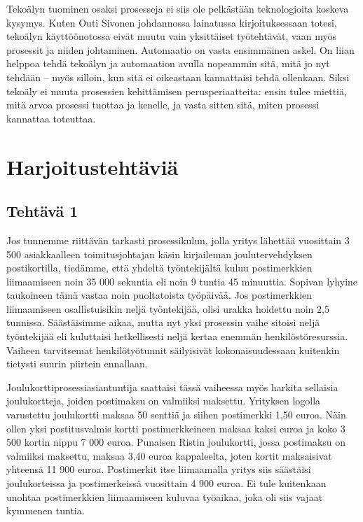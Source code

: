 \documentclass[
  finnish,
  letterpaper,
  DIV=11,
  numbers=noendperiod,
  oneside]{scrreprt}
\begin{document}
Tekoälyn tuominen osaksi prosesseja ei siis ole pelkästään teknologioita
koskeva kysymys. Kuten Outi Sivonen johdannossa lainatussa
kirjoituksessaan totesi, tekoälyn käyttöönotossa eivät muutu vain
yksittäiset työtehtävät, vaan myös prosessit ja niiden johtaminen.
Automaatio on vasta ensimmäinen askel. On liian helppoa tehdä tekoälyn
ja automaation avulla nopeammin sitä, mitä jo nyt tehdään -- myös
silloin, kun sitä ei oikeastaan kannattaisi tehdä ollenkaan. Siksi
tekoäly ei muuta prosessien kehittämisen perusperiaatteita: ensin tulee
miettiä, mitä arvoa prosessi tuottaa ja kenelle, ja vasta sitten sitä,
miten prosessi kannattaa toteuttaa.


\chapter{Harjoitustehtäviä}\label{harjoitustehtuxe4viuxe4}

\section{Tehtävä 1}\label{tehtuxe4vuxe4-1}

Jos tunnemme riittävän tarkasti prosessikulun, jolla yritys lähettää
vuosittain 3 500 asiakkaalleen toimitusjohtajan käsin kirjaileman
joulutervehdyksen postikortilla, tiedämme, että yhdeltä työntekijältä
kuluu postimerkkien liimaamiseen noin 35 000 sekuntia eli noin 9 tuntia
45 minuuttia. Sopivan lyhyine taukoineen tämä vastaa noin puoltatoista
työpäivää. Jos postimerkkien liimaamiseen osallistuisikin neljä
työntekijää, olisi urakka hoidettu noin 2,5 tunnissa. Säästäisimme
aikaa, mutta nyt yksi prosessin vaihe sitoisi neljä työntekijää eli
kuluttaisi hetkellisesti neljä kertaa enemmän henkilöstöresurssia.
Vaiheen tarvitsemat henkilötyötunnit säilyisivät kokonaisuudessaan
kuitenkin tietysti suurin piirtein ennallaan.

Joulukorttiprosessiasiantuntija saattaisi tässä vaiheessa myös harkita
sellaisia joulukortteja, joiden postimaksu on valmiiksi maksettu.
Yrityksen logolla varustettu joulukortti maksaa 50 senttiä ja siihen
postimerkki 1,50 euroa. Näin ollen yksi postitusvalmis kortti
postimerkkeineen maksaa kaksi euroa ja koko 3 500 kortin nippu 7 000
euroa. Punaisen Ristin joulukortti, jossa postimaksu on valmiiksi
maksettu, maksaa 3,40 euroa kappaleelta, joten kortit maksaisivat
yhteensä 11 900 euroa. Postimerkit itse liimaamalla yritys siis
säästäisi joulukorteissa ja postimerkeissä vuosittain 4 900 euroa. Ei
tule kuitenkaan unohtaa postimerkkien liimaamiseen kuluvaa työaikaa,
joka oli siis vajaat kymmenen tuntia.
\end{document}
